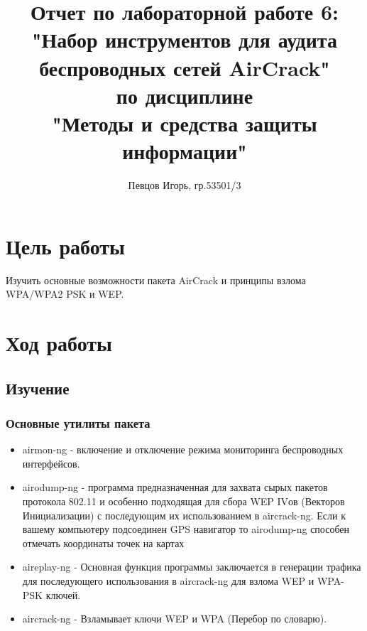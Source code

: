 \documentclass[a4paper, 14pt]{article}				%
\author{Певцов Игорь, гр.53501/3}
\title{Отчет по лабораторной работе 6:\\"Набор инструментов для аудита беспроводных сетей AirCrack"\\ по дисциплине\\"Методы и средства защиты информации"}
\begin{document}
\maketitle

\newpage
\tableofcontents{}

\newpage
\section{Цель работы}
Изучить основные возможности пакета AirCrack и принципы взлома WPA/WPA2 PSK и WEP.
\section{Ход работы}


\subsection{Изучение}
\subsubsection{Основные утилиты пакета}
\begin{itemize}
\item airmon-ng - включение и отключение режима мониторинга беспроводных интерфейсов.
\item airodump-ng - программа предназначенная для захвата сырых пакетов протокола 802.11 и особенно подходящая для сбора WEP IVов (Векторов Инициализации) с последующим их использованием в aircrack-ng. Если к вашему компьютеру подсоединен GPS навигатор
то airodump-ng способен отмечать координаты точек на картах

\item aireplay-ng - Основная функция программы заключается в генерации трафика для последующего использования в aircrack-ng для взлома WEP и WPA-PSK ключей.

\item aircrack-ng - Взламывает ключи WEP и WPA (Перебор по словарю).
\end{itemize}
\end{document}
